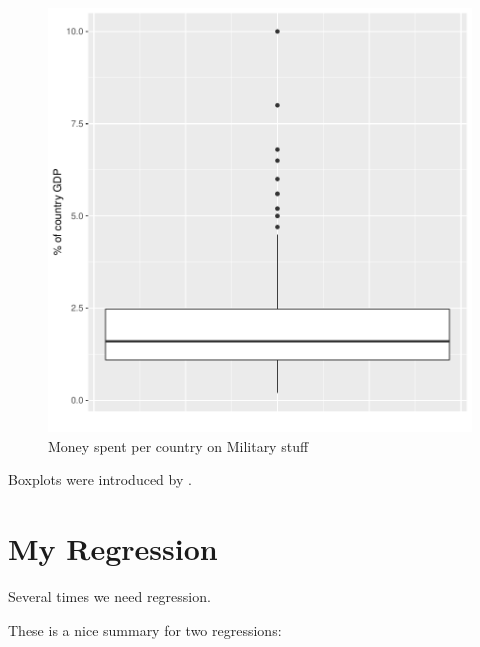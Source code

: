 \documentclass[11pt]{article}
\begin{document}
\begin{figure}[h]
\centering
\begin{adjustbox}{width=7cm,height=5.5cm,clip,trim=0cm 0.5cm 0cm 0cm} 
\includegraphics{WorkInR_forPrinter-num_plot}
\end{adjustbox}
\caption{Money spent per country on Military stuff}  
\label{num_plot} 
\end{figure}

Boxplots were introduced by \citet{tukey_exploratory_1977}.


\section{My Regression}\label{regre}

Several times we need regression.



These is a nice summary for two regressions:
\end{document}
